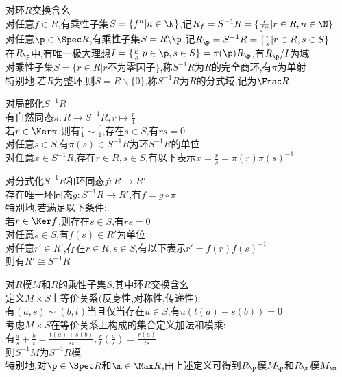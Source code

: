 \begin{dingyi}
对环$R$交换含幺\\
对任意$f\in R$,有乘性子集$S=\{f^{n}|n\in \N\}$,记$R_{f}=S^{-1}R=\{\frac{r}{f^{n}}|r\in R,n\in \N\}$\\
对任意$\p\in \Spec R$,有乘性子集$S=R\backslash\p$,记$R_{\p}=S^{-1}R=\{\frac{r}{s}|r\in R,s\in S\}$\\
在$R_{\p}$中,有唯一极大理想$I=\{\frac{p}{s}|p\in \p,s\in S\}=\pi(\p)R_{\p}$,有$R_{\p}/I$为域\\
对乘性子集$S=\{r\in R|r\text{不为零因子}\}$,称$S^{-1}R$为$R$的完全商环,有$\pi$为单射\\
特别地,若$R$为整环,则$S=R\backslash\{0\}$,称$S^{-1}R$为$R$的分式域,记为$\Frac R$
\end{dingyi}

\begin{tuilun}
对局部化$S^{-1}R$\\
有自然同态$\pi:R\to S^{-1}R,r\mapsto \frac{r}{1}$\\
若$r\in \Ker \pi$,则有$\frac{r}{1}\sim \frac{0}{1}$,存在$s\in S$,有$rs=0$\\
对任意$s\in S$,有$\pi(s)\in S^{-1}R$为环$S^{-1}R$的单位\\
对任意$x\in S^{-1}R$,存在$r\in R,s\in S$,有以下表示$x=\frac{r}{s}=\pi(r)\pi(s)^{-1}$
\end{tuilun}

\begin{dingli}
对分式化$S^{-1}R$和环同态$f:R\to R'$\\
存在唯一环同态$g:S^{-1}R\to R'$,有$f=g\circ \pi$\\
特别地,若满足以下条件:\\
若$r\in \Ker f$,则存在$s\in S$,有$rs=0$\\
对任意$s\in S$,有$f(s)\in R'$为单位\\
对任意$r'\in R'$,存在$r\in R,s\in S$,有以下表示$r'=f(r)f(s)^{-1}$\\
则有$R'\cong S^{-1}R$
\end{dingli}

\begin{dingyi}
对$R$模$M$和$R$的乘性子集$S$,其中环$R$交换含幺\\
定义$M\times S$上等价关系$($反身性,对称性,传递性$)$:\\
有$(a,s)\sim (b,t)$当且仅当存在$u\in S$,有$u(t(a)-s(b))=0$\\
考虑$M\times S$在等价关系上构成的集合定义加法和模乘:\\
有$\frac{a}{s}+\frac{b}{t}=\frac{t(a)+s(b)}{st},\frac{r}{t}(\frac{a}{s})=\frac{r(a)}{ts}$\\
则$S^{-1}M$为$S^{-1}R$模\\
特别地,对$\p\in \Spec R$和$\m\in \Max R$,由上述定义可得到$R_{\p}$模$M_{\p}$和$R_{\m}$模$M_{\m}$
\end{dingyi}

